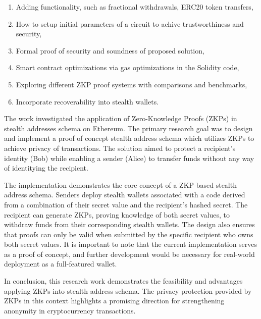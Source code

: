 \documentclass[conference,comsoc,10pt]{IEEEtran}
\begin{document}
    \begin{enumerate}
        \item Adding functionality, such as fractional withdrawals, ERC20 token transfers,
        \item How to setup initial parameters of a circuit to achive trustworthiness
                and security,
        \item Formal proof of security and soundness of proposed solution,
        \item Smart contract optimizations via gas optimizations in the Solidity code,
        \item Exploring different ZKP proof systems with comparisons and benchmarks,
        \item Incorporate recoverability into stealth wallets.
    \end{enumerate}

    The work investigated the application of Zero-Knowledge Proofs (ZKPs)
    in stealth addresses schema on Ethereum. The primary research
    goal was to design and implement a proof of concept stealth address schema
    which utilizes ZKPs to achieve privacy of transactions.
    The solution aimed to protect a recipient's identity (Bob) while enabling
    a sender (Alice) to transfer funds without any way of identitying the
    recipient.

    The implementation demonstrates the core concept of a
    ZKP-based stealth address schema. Senders deploy stealth wallets
    associated with a code derived from a combination of their secret value
    and the recipient's hashed secret. The recipient can generate ZKPs,
    proving knowledge of both secret values, to withdraw funds from their
    corresponding stealth wallets. The design also ensures that proofs can
    only be valid when submitted by the specific recipient who owns both
    secret values. It is important to note that the current implementation
    serves as a proof of concept, and further development
    would be necessary for real-world deployment as a full-featured wallet. 

    In conclusion, this research work demonstrates the feasibility and
    advantages applying ZKPs into stealth address schema. The privacy
    protection provided by ZKPs in this context highlights a promising
    direction for strengthening anonymity in cryptocurrency transactions.
\end{document}
